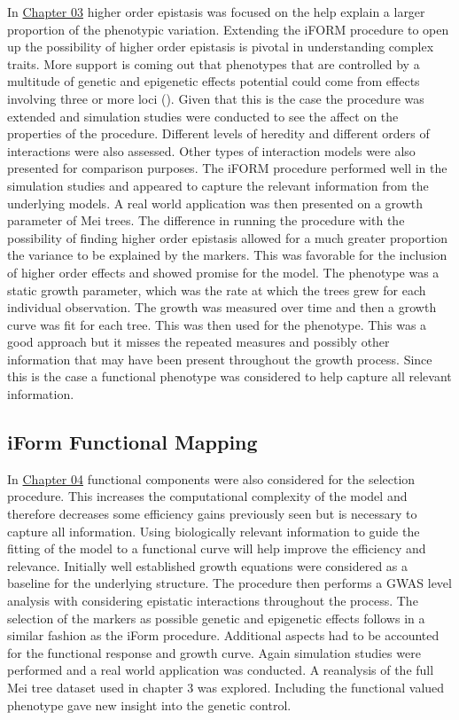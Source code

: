 \documentclass[11pt,]{book}
\theoremstyle{definition}
\theoremstyle{definition}
\theoremstyle{remark}
\begin{document}
In \protect\hyperlink{highorder}{Chapter 03} higher order epistasis was
focused on the help explain a larger proportion of the phenotypic
variation. Extending the iFORM procedure to open up the possibility of
higher order epistasis is pivotal in understanding complex traits. More
support is coming out that phenotypes that are controlled by a multitude
of genetic and epigenetic effects potential could come from effects
involving three or more loci (\cite{taylor2014genetic}). Given that this
is the case the procedure was extended and simulation studies were
conducted to see the affect on the properties of the procedure.
Different levels of heredity and different orders of interactions were
also assessed. Other types of interaction models were also presented for
comparison purposes. The iFORM procedure performed well in the
simulation studies and appeared to capture the relevant information from
the underlying models. A real world application was then presented on a
growth parameter of Mei trees. The difference in running the procedure
with the possibility of finding higher order epistasis allowed for a
much greater proportion the variance to be explained by the markers.
This was favorable for the inclusion of higher order effects and showed
promise for the model. The phenotype was a static growth parameter,
which was the rate at which the trees grew for each individual
observation. The growth was measured over time and then a growth curve
was fit for each tree. This was then used for the phenotype. This was a
good approach but it misses the repeated measures and possibly other
information that may have been present throughout the growth process.
Since this is the case a functional phenotype was considered to help
capture all relevant information.

\subsection{iForm Functional Mapping}\label{iform-functional-mapping}

In \protect\hyperlink{iformfunc}{Chapter 04} functional components were
also considered for the selection procedure. This increases the
computational complexity of the model and therefore decreases some
efficiency gains previously seen but is necessary to capture all
information. Using biologically relevant information to guide the
fitting of the model to a functional curve will help improve the
efficiency and relevance. Initially well established growth equations
were considered as a baseline for the underlying structure. The
procedure then performs a GWAS level analysis with considering epistatic
interactions throughout the process. The selection of the markers as
possible genetic and epigenetic effects follows in a similar fashion as
the iForm procedure. Additional aspects had to be accounted for the
functional response and growth curve. Again simulation studies were
performed and a real world application was conducted. A reanalysis of
the full Mei tree dataset used in chapter 3 was explored. Including the
functional valued phenotype gave new insight into the genetic control.
\end{document}
